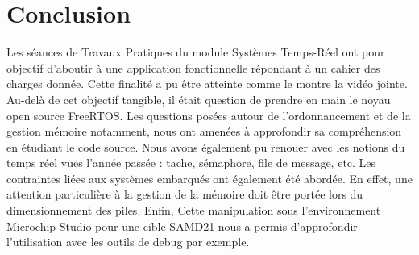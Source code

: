 \section*{Conclusion}

Les séances de Travaux Pratiques du module Systèmes Temps-Réel ont pour objectif d'aboutir à une application fonctionnelle répondant à un cahier des charges donnée.
Cette finalité a pu être atteinte comme le montre la vidéo jointe.
Au-delà de cet objectif tangible, il était question de prendre en main le noyau open source FreeRTOS.
Les questions posées autour de l'ordonnancement et de la gestion mémoire notamment, nous ont amenées à approfondir sa compréhension en étudiant le code source.
\gap
Nous avons également pu renouer avec les notions du temps réel vues l'année passée : tache, sémaphore, file de message, etc.
Les contraintes liées aux systèmes embarqués ont également été abordée.
En effet, une attention particulière à la gestion de la mémoire doit être portée lors du dimensionnement des piles.
Enfin, Cette manipulation sous l'environnement Microchip Studio pour une cible SAMD21 nous a permis d'approfondir l'utilisation avec les outils de debug par exemple.
